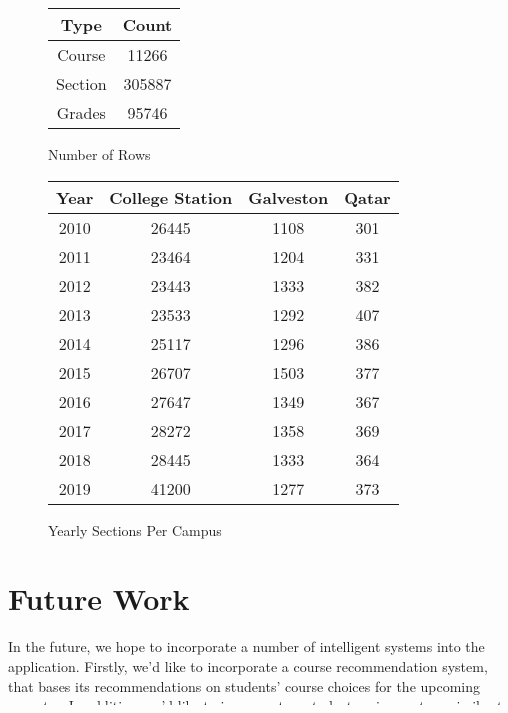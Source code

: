 \documentclass{article}
\begin{document}
\begin{figure}[h]
    \centering
    \begin{tabular}{|c|c|}
        \hline
        Type    & Count  \\\hline
        Course  & 11266  \\\hline
        Section & 305887 \\\hline
        Grades  & 95746  \\\hline
    \end{tabular}
    \caption[totals]{Number of Rows}
    \label{fig:rows}
\end{figure}
\begin{figure}[h]
    \centering
    \begin{tabular}{|c|c|c|c|}
        \hline
        Year & College Station & Galveston & Qatar \\\hline
        2010 & 26445           & 1108      & 301   \\\hline
        2011 & 23464           & 1204      & 331   \\\hline
        2012 & 23443           & 1333      & 382   \\\hline
        2013 & 23533           & 1292      & 407   \\\hline
        2014 & 25117           & 1296      & 386   \\\hline
        2015 & 26707           & 1503      & 377   \\\hline
        2016 & 27647           & 1349      & 367   \\\hline
        2017 & 28272           & 1358      & 369   \\\hline
        2018 & 28445           & 1333      & 364   \\\hline
        2019 & 41200           & 1277      & 373   \\\hline
    \end{tabular}
    \caption{Yearly Sections Per Campus}
    \label{fig:years}
\end{figure}
\section{Future Work}
In the future, we hope to incorporate a number of intelligent systems into the application. Firstly, we'd like to incorporate a course recommendation system, that bases its recommendations on students' course choices for the upcoming semester. In addition, we'd like to incorporate a student review system, similar to PICA evaluations, where students would leave their qualitative feedback on instructors. Sentiment analysis and topic modeling could both be used in this capacity to provide simple tags and classifications for instructors for students.  Lastly, we'd like to employ the use of constraint solvers to enable students to provide a set of constraints (such as start and end time) and a set of courses, and have the solver generate a relatively optimal schedule.
\end{document}
